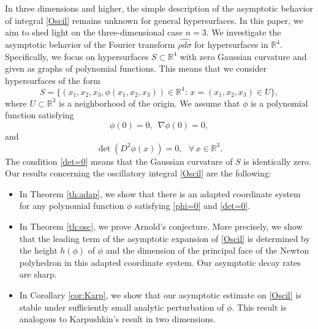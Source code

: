 \documentclass[a4paper, 11pt]{article}
\theoremstyle{plain}
\theoremstyle{definition}
\theoremstyle{lemma}
\theoremstyle{Remark}
\theoremstyle{proposition}
\theoremstyle{corollary}
\theoremstyle{example}
\theoremstyle{assumption}
\begin{document}
In three dimensions and higher, the simple description of the asymptotic behavior of integral \eqref{Oscil} remains unknown for general hypersurfaces. In this paper, we aim to shed light on the three-dimensional case $n=3$.  We investigate the asymptotic behavior of the Fourier transform $\widehat{\rho d\sigma}$ for hypersurfaces in $\mathbb{R}^4.$  %
 Specifically, we focus on hypersurfaces $S\subset \mathbb{R}^4$  with zero Gaussian curvature and given as  graphs of polynomial functions. This means that we consider  hypersurfaces   of the form
 \begin{equation*}
S=\{(x_1,x_2,x_3, \phi(x_1,x_2,x_3))\in \mathbb{R}^{4}:\,x=(x_1,x_2,x_3)\in U\},
\end{equation*}
 where $U\subset \mathbb{R}^3$ is a neighborhood of the origin. We assume that $\phi$ is a polynomial function satisfying
 \begin{equation}\label{phi=0}
 \phi(0)=0,\,\,\,\nabla \phi (0)=0,
 \end{equation} and
 \begin{equation}\label{det=0}
 \det(D^2\phi(x))=0,\,\,\,\,\forall\,x\in \mathbb{R}^3.
 \end{equation}
 The condition \eqref{det=0} means that the Gaussian curvature of $S$ is identically zero. Our results concerning the oscillatory integral  \eqref{Oscil} are the following:
 \begin{itemize}
 \item In Theorem \ref{th:adap}, we show that there is an adapted coordinate system for any polynomial function $\phi$ satisfying \eqref{phi=0} and \eqref{det=0}.
 \item In Theorem \ref{th:osc},  we prove Arnold's conjecture. More precisely, we show that the leading term of the asymptotic expansion of \eqref{Oscil} is determined by the height $h(\phi)$ of $\phi$ and the dimension of the principal face of the Newton polyhedron  in this adapted coordinate system.       Our asymptotic decay rates are sharp.
 \item In Corollary \ref{cor:Karp}, we show that our asymptotic estimate on \eqref{Oscil}  is stable under sufficiently small analytic perturbation of $\phi.$ This result is analogous to Karpushkin's result \cite{Kar} in two dimensions.
\end{itemize}
\end{document}

